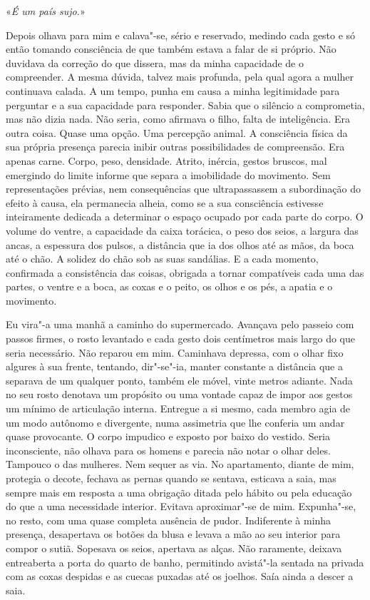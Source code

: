 «\emph{É um país sujo.}»

Depois olhava para mim e calava"-se, sério e reservado, medindo cada
gesto e só então tomando consciência de que também estava a falar de si
próprio. Não duvidava da correção do que dissera, mas da minha
capacidade de o compreender. A mesma dúvida, talvez mais profunda, pela
qual agora a mulher continuava calada. A um tempo, punha em causa a
minha legitimidade para perguntar e a sua capacidade para responder.
Sabia que o silêncio a comprometia, mas não dizia nada. Não seria, como
afirmava o filho, falta de inteligência. Era outra coisa. Quase uma
opção. Uma percepção animal. A consciência física da sua própria
presença parecia inibir outras possibilidades de compreensão. Era apenas
carne. Corpo, peso, densidade. Atrito, inércia, gestos bruscos, mal
emergindo do limite informe que separa a imobilidade do movimento. Sem
representações prévias, nem consequências que ultrapassassem a
subordinação do efeito à causa, ela permanecia alheia, como se a sua
consciência estivesse inteiramente dedicada a determinar o espaço
ocupado por cada parte do corpo. O volume do ventre, a capacidade da
caixa torácica, o peso dos seios, a largura das ancas, a espessura dos
pulsos, a distância que ia dos olhos até as mãos, da boca até o chão. A
solidez do chão sob as suas sandálias. E a cada momento, confirmada a
consistência das coisas, obrigada a tornar compatíveis cada uma das
partes, o ventre e a boca, as coxas e o peito, os olhos e os pés, a
apatia e o movimento.

Eu vira"-a uma manhã a caminho do supermercado. Avançava pelo passeio
com passos firmes, o rosto levantado e cada gesto dois centímetros mais
largo do que seria necessário. Não reparou em mim. Caminhava depressa,
com o olhar fixo algures à sua frente, tentando, dir"-se"-ia, manter
constante a distância que a separava de um qualquer ponto, também ele
móvel, vinte metros adiante. Nada no seu rosto denotava um propósito ou
uma vontade capaz de impor aos gestos um mínimo de articulação interna.
Entregue a si mesmo, cada membro agia de um modo autônomo e divergente,
numa assimetria que lhe conferia um andar quase provocante. O corpo
impudico e exposto por baixo do vestido. Seria inconsciente, não olhava
para os homens e parecia não notar o olhar deles. Tampouco o das
mulheres. Nem sequer as via. No apartamento, diante de mim, protegia o
decote, fechava as pernas quando se sentava, esticava a saia, mas sempre
mais em resposta a uma obrigação ditada pelo hábito ou pela educação do
que a uma necessidade interior. Evitava aproximar"-se de mim.
Expunha"-se, no resto, com uma quase completa ausência de pudor.
Indiferente à minha presença, desapertava os botões da blusa e levava a
mão ao seu interior para compor o sutiã. Sopesava os seios, apertava as
alças. Não raramente, deixava entreaberta a porta do quarto de banho,
permitindo avistá"-la sentada na privada com as coxas despidas e as
cuecas puxadas até os joelhos. Saía ainda a descer a saia.

